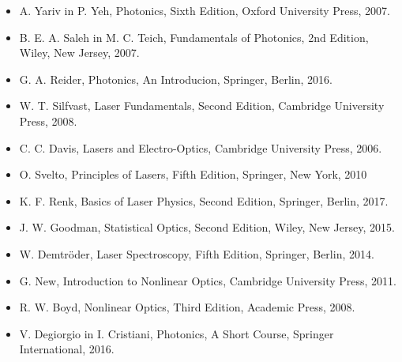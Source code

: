 \documentclass[11pt,fleqn]{book} %
\begin{document}
\begin{itemize}
\setlength\itemsep{0.5em}
 \item A. Yariv in P. Yeh, Photonics, Sixth Edition, Oxford University Press, 2007.
 \item B. E. A. Saleh in M. C. Teich, Fundamentals of Photonics, 2nd Edition, Wiley, New Jersey, 2007. 
 \item G. A. Reider, Photonics, An Introducion, Springer, Berlin, 2016.
 \item W. T. Silfvast, Laser Fundamentals, Second Edition, Cambridge University Press, 2008. 
 \item C. C. Davis, Lasers and Electro-Optics, Cambridge University Press, 2006.
 \item O. Svelto, Principles of Lasers, Fifth Edition, Springer, New York, 2010
 \item K. F. Renk, Basics of Laser Physics, Second Edition, Springer, Berlin, 2017.
 \item J. W. Goodman, Statistical Optics, Second Edition, Wiley, New Jersey, 2015.
 \item W. Demtr\"oder, Laser Spectroscopy, Fifth Edition, Springer, Berlin, 2014.
 \item G. New, Introduction to Nonlinear Optics, Cambridge University Press, 2011.
 \item R. W. Boyd, Nonlinear Optics, Third Edition, Academic Press, 2008.
 \item V. Degiorgio in I. Cristiani, Photonics, A Short Course, Springer International, 2016.
\end{itemize}










\end{document}
